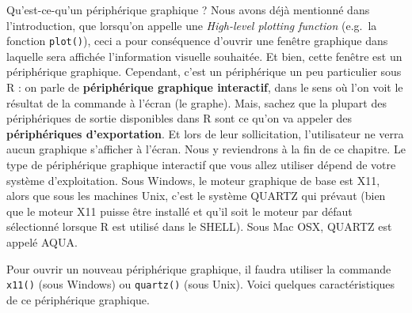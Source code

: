 \documentclass[]{article}
\newenvironment{Shaded}{\begin{snugshade}}{\end{snugshade}}
\newcommand{\CommentTok}[1]{\textcolor[rgb]{0.56,0.35,0.01}{\textit{#1}}}
\newcommand{\KeywordTok}[1]{\textcolor[rgb]{0.13,0.29,0.53}{\textbf{#1}}}
\newcommand{\NormalTok}[1]{#1}
\newcommand{\OperatorTok}[1]{\textcolor[rgb]{0.81,0.36,0.00}{\textbf{#1}}}
\begin{document}
Qu'est-ce-qu'un périphérique graphique ? Nous avons déjà mentionné dans l'introduction, que lorsqu'on appelle une \emph{High-level plotting function} (e.g.~la fonction \texttt{plot()}), ceci a pour conséquence d'ouvrir une fenêtre graphique dans laquelle sera affichée l'information visuelle souhaitée. Et bien, cette fenêtre est un périphérique graphique. Cependant, c'est un périphérique un peu particulier sous R : on parle de \textbf{périphérique graphique interactif}, dans le sens où l'on voit le résultat de la commande à l'écran (le graphe). Mais, sachez que la plupart des périphériques de sortie disponibles dans R sont ce qu'on va appeler des \textbf{périphériques d'exportation}. Et lors de leur sollicitation, l'utilisateur ne verra aucun graphique s'afficher à l'écran. Nous y reviendrons à la fin de ce chapitre.
Le type de périphérique graphique interactif que vous allez utiliser dépend de votre système d'exploitation. Sous Windows, le moteur graphique de base est X11, alors que sous les machines Unix, c'est le système QUARTZ qui prévaut (bien que le moteur X11 puisse être installé et qu'il soit le moteur par défaut sélectionné lorsque R est utilisé dans le SHELL). Sous Mac OSX, QUARTZ est appelé AQUA.

\begin{Shaded}
\end{Shaded}

Pour ouvrir un nouveau périphérique graphique, il faudra utiliser la commande \texttt{x11()} (sous Windows) ou \texttt{quartz()} (sous Unix). Voici quelques caractéristiques de ce périphérique graphique.

\begin{Shaded}
\end{Shaded}
\end{document}
